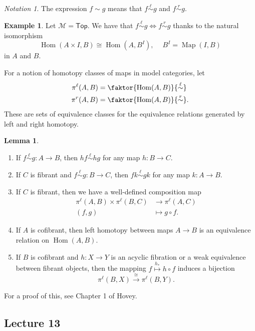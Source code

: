\documentclass[10pt,letterpaper,cm]{nupset}
\theoremstyle{definition}
\newtheorem{exmp}[defn]{Example}
\theoremstyle{theorem}
\newtheorem{lemma}[defn]{Lemma}
\theoremstyle{remark}
\newtheorem*{notation}{Notation}
\newcommand{\1}{\mathbb{1}}
\newcommand{\m}{\mathcal{M}}
\newcommand{\0}{\vec 0}
\DeclareMathOperator{\Hom}{Hom}
\DeclareMathOperator{\map}{Map}
\newcommand{\be}{\begin{enumerate}}
\newcommand{\ee}{\end{enumerate}}
\begin{document}
\begin{notation}
The expression $f \sim g$ means that $f \overset{\ell}{\sim} g$ and $f \overset{r}{\sim} g$.
\end{notation}

\begin{exmp}
Let $\m = \mathsf{Top}$. We have that $f \overset{\ell}{\sim} g \iff f \overset{r}{\sim} g$ thanks to the natural isomorphism
\[
\Hom(A \times I, B) \cong \Hom(A, B^I), \ \quad B^I = \map(I, B)
\]  in $A$ and $B$.
\end{exmp}

\smallskip

For a notion of homotopy classes of maps in model categories, let
\begin{align*}
\pi^{\ell}(A,B) & = \faktor{\Hom(A,B)}{\overset{\ell}{\sim}}
\\ \pi^{r}(A,B) &= \faktor{\Hom(A,B)}{\overset{r}{\sim}}
.
\end{align*}
These are sets of equivalence classes for the equivalence relations generated by  left and right homotopy. 
\pagebreak
\begin{lemma}\label{props} $ $
\be[label=(\arabic*)]
\item If $f \overset{\ell}{\sim} g : A \to B$, then $hf \overset{\ell}{\sim} hg$ for any map $h : B \to C$.
\item If $C$ is fibrant  and $f \overset{\ell}{\sim} g : B \to C$, then $fk \overset{\ell}{\sim} gk$ for any map $k : A \to B$.
\item If $C$ is fibrant, then we have a well-defined composition map
\begin{align*}
\pi^{\ell}(A,B) \times \pi^{\ell}(B,C) & \to \pi^{\ell}(A,C)
\\ \left(f,g\right) & \mapsto g \circ f.
\end{align*}
\item If $A$ is cofibrant, then left homotopy between maps $A \to B$ is an equivalence relation on $\Hom(A,B)$.
\item If $B$ is cofibrant and $h: X \to Y$ is an acyclic fibration or a weak equivalence between fibrant objects, then the mapping $f \overset{h_{\ast}}{\longmapsto} h \circ f$ induces a bijection
\[
\pi^{\ell}(B,X) \xrightarrow{\cong} \pi^{\ell}(B,Y).
\]
\ee
\end{lemma}
For a proof of this, see Chapter 1 of Hovey.

\subsection{Lecture 13}
\end{document}
